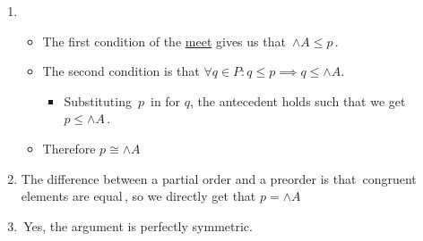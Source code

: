 \begin{enumerate}
    \item \begin{itemize}
            \item The first condition of the \hyperref[D1.81]{meet} gives us that \,$\wedge A \leq p$\,.
            \item The second condition is that $\forall q \in P: q \leq p \implies q \leq \wedge A$.
                  \begin{itemize}
                    \item Substituting \,$p$\, in for $q$, the antecedent holds such that we get \,$p \leq \wedge A$\,.
                  \end{itemize}
            \item Therefore $p \cong \wedge A$
          \end{itemize}
    \item The difference between a partial order and a preorder is that \,congruent elements are equal\,, so we directly get that $p = \wedge A$
    \item \,Yes, the argument is perfectly symmetric.\,
  \end{enumerate}